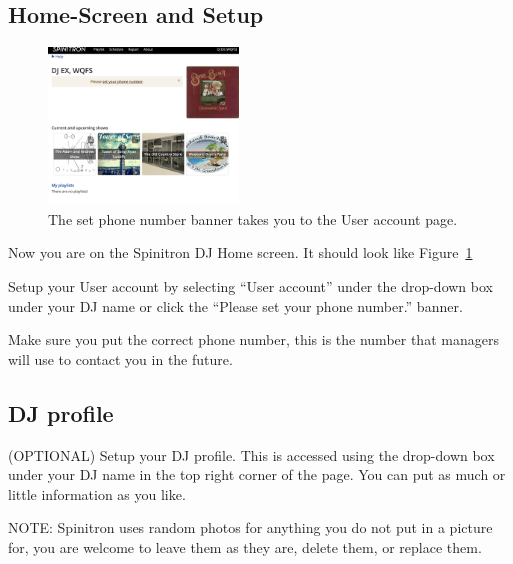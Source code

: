 \documentclass[12pt]{article}
\begin{document}



\subsection{Home-Screen and Setup}

\begin{figure}
    \includegraphics[width=0.45\textwidth]{images/phone_banner.png}
    \caption{The set phone number banner takes you to the User account page.}
    \label{fig4}
\end{figure}

Now you are on the Spinitron DJ Home screen. 
It should look like Figure~\ref{fig4}

Setup your User account by selecting ``User account'' under the drop-down box under your DJ name or click the ``Please set your phone number.'' banner.

Make sure you put the correct phone number, this is the number that managers will use to contact you in the future.

\clearpage
\newpage

\subsection{DJ profile}

(OPTIONAL) Setup your DJ profile. This is accessed using the drop-down box under your DJ name in the top right corner of the page. 
You can put as much or little information as you like.

NOTE: Spinitron uses random photos for anything you do not put in a picture for, you are welcome to leave them as they are, delete them, or replace them.
\end{document}
